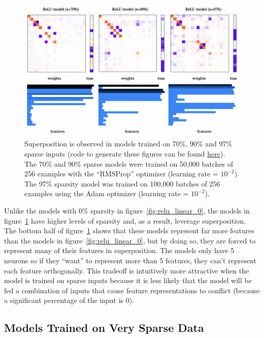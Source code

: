 \documentclass{article} %
\begin{document}
\begin{figure}[h]
    \centering
    \includegraphics[width=0.75\linewidth]{demonstrating_superposition/images/sparsity_superposition1.png}
    \captionsetup{font=footnotesize, width=0.71\linewidth} %
    \caption{
        Superposition is observed in models trained on 70\%, 90\% and 97\% 
        sparse inputs (code to generate these figures can be found 
        \href{https://github.com/zroe1/toy-models-of-superposition/blob/main/demonstrating_superposition/demonstrating_superposition.ipynb}{here}). 
        The 70\% and 90\% sparse models were trained on 50,000 batches of 256 
        examples with the ``RMSProp'' optimizer (learning rate = $10^{-2}$). The 
        97\% sparsity model was trained on 100,000 batches of 256 examples using 
        the Adam optimizer (learning rate = $10^{-2}$).
    }
    \label{fig:sparsity_1}
\end{figure}

Unlike the models with 0\% sparsity in figure~\ref{fig:relu_linear_0}, the models
in figure~\ref{fig:sparsity_1} have higher levels of sparsity and, as
a result, leverage superposition. The bottom half of figure~\ref{fig:sparsity_1}
shows that these models represent far more features than the models in
figure~\ref{fig:relu_linear_0}, but by doing so, they are forced to represent many 
of their features in superposition. The models only have 5 neurons so if they 
``want'' to represent more than 5 features, they can't represent each feature 
orthogonally. This tradeoff is intuitively more attractive when the model is
trained on sparse inputs because it is less likely that the model will be fed
a combination of inputs that cause feature representations to conflict (because
a significant percentage of the input is 0).


\subsection{Models Trained on Very Sparse Data}
\end{document}
